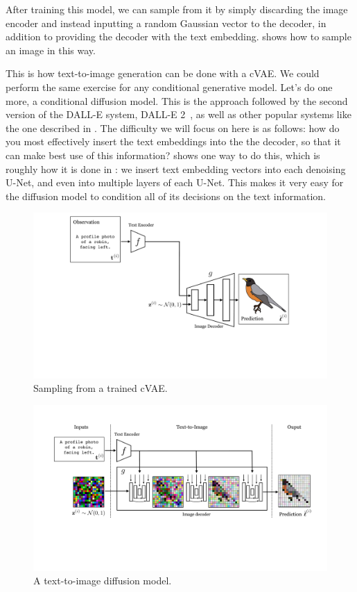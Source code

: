 After training this model, we can sample from it by simply discarding the image encoder and instead inputting a random Gaussian vector to the decoder, in addition to providing the decoder with the text embedding. \Fig{\ref{fig:vision_and_language:text2im_VAE_sampling}} shows how to sample an image in this way.

This is how text-to-image generation can be done with a cVAE. We could perform the same exercise for any conditional generative model. Let's do one more, a conditional diffusion model. This is the approach followed by the second version of the DALL-E system, DALL-E 2~\cite{ramesh2022hierarchical}, as well as other popular systems like the one described in \cite{rombach2022high}. The difficulty we will focus on here is as follows: how do you most effectively insert the text embeddings into the the decoder, so that it can make best use of this information? \Fig{\ref{fig:vision_and_language:text2im_diffusion_model}} shows one way to do this, which is roughly how it is done in \cite{rombach2022high}: we insert text embedding vectors into each denoising U-Net, and even into multiple layers of each U-Net. This makes it very easy for the diffusion model to condition all of its decisions on the text information.
\begin{figure}[h!]
    \centerline{
    \includegraphics[width=1.0\linewidth]{./figures/vision_and_language/text2im_VAE_sampling.pdf}
    }
    \caption{Sampling from a trained cVAE.}
    \label{fig:vision_and_language:text2im_VAE_sampling}
\end{figure}
\begin{figure}[h!]
    \centerline{
    \includegraphics[width=1.0\linewidth]{./figures/vision_and_language/text2im_diffusion_model.pdf}
    }
    \caption{A text-to-image diffusion model.}
    \label{fig:vision_and_language:text2im_diffusion_model}
\end{figure}
